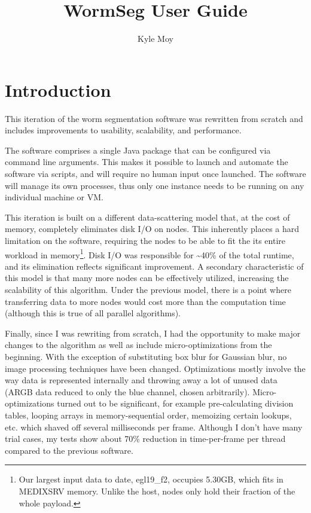 \documentclass[]{article}
\title{WormSeg User Guide}
\author{Kyle Moy}
\begin{document}
\maketitle

\section{Introduction}
This iteration of the worm segmentation software was rewritten from scratch and includes improvements to usability, scalability, and performance.

The software comprises a single Java package that can be configured via command line arguments. This makes it possible to launch and automate the software via scripts, and will require no human input once launched. The software will manage its own processes, thus only one instance needs to be running on any individual machine or VM.

This iteration is built on a different data-scattering model that, at the cost of memory, completely eliminates disk I/O on nodes. This inherently places a hard limitation on the software, requiring the nodes to be able to fit the its entire workload in memory\footnote{Our largest input data to date, egl19\_f2, occupies 5.30GB, which fits in MEDIXSRV memory. Unlike the host, nodes only hold their fraction of the whole payload.}. Disk I/O was responsible for \textasciitilde 40\% of the total runtime, and its elimination reflects significant improvement. A secondary characteristic of this model is that many more nodes can be effectively utilized, increasing the scalability of this algorithm. Under the previous model, there is a point where transferring data to more nodes would cost more than the computation time (although this is true of all parallel algorithms).

Finally, since I was rewriting from scratch, I had the opportunity to make major changes to the algorithm as well as include micro-optimizations from the beginning. With the exception of substituting box blur for Gaussian blur, no image processing techniques have been changed. Optimizations mostly involve the way data is represented internally and throwing away a lot of unused data (ARGB data reduced to only the blue channel, chosen arbitrarily). Micro-optimizations turned out to be significant, for example pre-calculating division tables, looping arrays in memory-sequential order, memoizing certain lookups, etc. which shaved off several milliseconds per frame. Although I don't have many trial cases, my tests show about 70\% reduction in time-per-frame per thread compared to the previous software.
\end{document}
